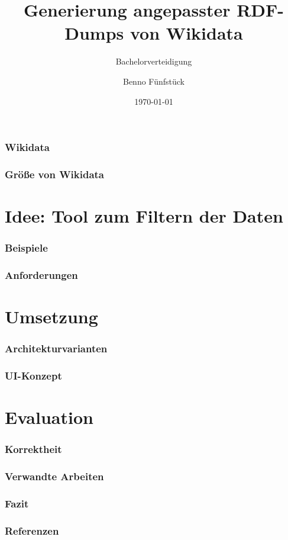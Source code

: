 \documentclass[aspectratio=1610,xcolor=svgnames]{beamer}
\title{Generierung angepasster RDF-Dumps von Wikidata}
\subtitle{Bachelorverteidigung}
\date{\today}
\author{Benno Fünfstück}
\institute{Betreuer: Prof. Dr. Markus Krötzsch \\ Wissensbasierte Systeme \\ TU Dresden}
\begin{document}
\begin{frame}
\maketitle
\end{frame}

\begin{frame}\frametitle{Wikidata}
\end{frame}

\begin{frame}\frametitle{Größe von Wikidata}
\end{frame}

\section{Idee: Tool zum Filtern der Daten}

\begin{frame}\frametitle{Beispiele}
\end{frame}

\begin{frame}\frametitle{Anforderungen}
\end{frame}

\section{Umsetzung}

\begin{frame}\frametitle{Architekturvarianten}
\end{frame}

\begin{frame}\frametitle{UI-Konzept}
\end{frame}

\section{Evaluation}

\begin{frame}\frametitle{Korrektheit}
\end{frame}

\begin{frame}\frametitle{Verwandte Arbeiten}
\end{frame}

\begin{frame}\frametitle{Fazit}
\end{frame}

\appendix

\begin{frame}\frametitle{Referenzen}
\end{frame}
\end{document}
